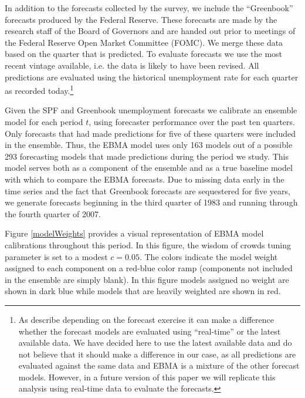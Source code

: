 \documentclass[12pt,fullpage,endnotes]{article}
\begin{document}
In addition to the forecasts collected by the survey, we include the ``Greenbook'' forecasts produced by the Federal Reserve. These forecasts are made by the research staff of the Board of Governors and are handed out prior to meetings of the Federal Reserve Open Market Committee (FOMC). We merge these data based on the quarter that is predicted. To evaluate forecasts we use the most recent vintage available, i.e. the data is likely to have been revised. All predictions are evaluated using the historical unemployment rate for each quarter as recorded today.\footnote{As \citet{Croushore:Stark:2001} describe depending on the forecast exercise it can make a difference whether the forecast models are evaluated using ``real-time'' or the latest available data. We have decided here to use the latest available data and do not believe that it should make a difference in our case, as all predictions are evaluated against the same data and EBMA is a mixture of the other forecast models. However, in a future version of this paper we will replicate this analysis using real-time data to evaluate the forecasts.}

Given the SPF and Greenbook unemployment forecasts we calibrate an ensemble model for each period $t$, using forecaster
performance over the past ten quarters.  Only forecasts that had made
predictions for five of these quarters were included in the ensemble.
Thus, the EBMA model uses only 163 models out of a possible 293
forecasting models that made predictions during the period we study.
  This model serves both as a component of the ensemble and as a true baseline %
model with which to compare the EBMA forecasts. Due to missing data
early in the time series and the fact that Greenbook forecasts are
sequestered for five years, we generate forecasts beginning in the
third quarter of 1983 and running through the fourth quarter of 2007.


Figure \ref{modelWeights} provides a visual representation of EBMA
model calibrations throughout this period.  In this figure, the wisdom
of crowds tuning parameter is set to a modest $c=0.05$.  The colors
indicate the model weight assigned to each component on a red-blue
color ramp (components not included in the ensemble are simply blank).  In this figure
models assigned no weight are shown in dark blue while models that are
heavily weighted are shown in red.
\end{document}
